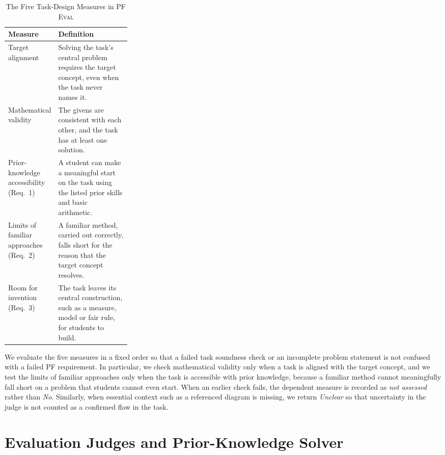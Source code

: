 \begin{table}[!htb]
\centering
\caption[The Five Task-Design Measures in \textsc{PF Eval}]{The Five Task-Design Measures in \textsc{PF Eval}}
\label{tab:eval-five-measures}
\vspace{0.5em}
\footnotesize
\setlength{\tabcolsep}{8pt}
\renewcommand{\arraystretch}{1.2}
\begin{tabularx}{\linewidth}{@{} >{\raggedright\arraybackslash}p{0.28\linewidth} >{\raggedright\arraybackslash}X @{}}
\toprule
\textbf{Measure} & \textbf{Definition} \\
\midrule
Target alignment & Solving the task's central problem requires the target concept, even when the task never names it. \\
\addlinespace[5pt]
Mathematical validity & The givens are consistent with each other, and the task has at least one solution. \\
\cmidrule(l{0pt}r{0pt}){1-2}
Prior-knowledge accessibility (Req.~1) & A student can make a meaningful start on the task using the listed prior skills and basic arithmetic. \\
\addlinespace[5pt]
Limits of familiar approaches (Req.~2) & A familiar method, carried out correctly, falls short for the reason that the target concept resolves. \\
\addlinespace[5pt]
Room for invention (Req.~3) & The task leaves its central construction, such as a measure, model or fair rule, for students to build. \\
\bottomrule
\end{tabularx}
\end{table}

We evaluate the five measures in a fixed order so that a failed task soundness check or an incomplete problem statement is not confused with a failed PF requirement. In particular, we check mathematical validity only when a task is aligned with the target concept, and we test the limits of familiar approaches only when the task is accessible with prior knowledge, because a familiar method cannot meaningfully fall short on a problem that students cannot even start. When an earlier check fails, the dependent measure is recorded as \emph{not assessed} rather than \emph{No}. Similarly, when essential context such as a referenced diagram is missing, we return \emph{Unclear} so that uncertainty in the judge is not counted as a confirmed flaw in the task.

\section{Evaluation Judges and Prior-Knowledge Solver}
\label{sec:eval-three-roles}

